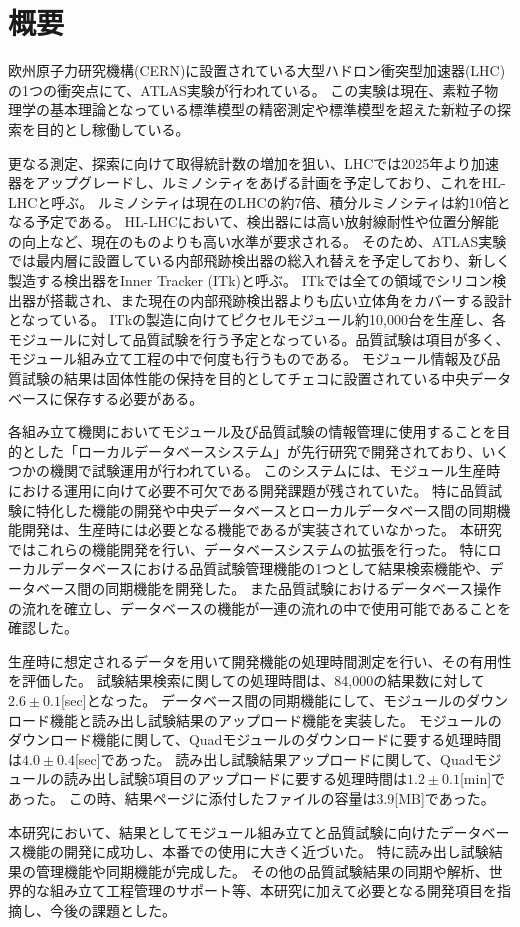 \chapter*{概要}

欧州原子力研究機構(CERN)に設置されている大型ハドロン衝突型加速器(LHC)の1つの衝突点にて、ATLAS実験が行われている。
この実験は現在、素粒子物理学の基本理論となっている標準模型の精密測定や標準模型を超えた新粒子の探索を目的とし稼働している。

更なる測定、探索に向けて取得統計数の増加を狙い、LHCでは2025年より加速器をアップグレードし、ルミノシティをあげる計画を予定しており、これをHL-LHCと呼ぶ。
ルミノシティは現在のLHCの約7倍、積分ルミノシティは約10倍となる予定である。
HL-LHCにおいて、検出器には高い放射線耐性や位置分解能の向上など、現在のものよりも高い水準が要求される。
そのため、ATLAS実験では最内層に設置している内部飛跡検出器の総入れ替えを予定しており、新しく製造する検出器をInner Tracker (ITk)と呼ぶ。
ITkでは全ての領域でシリコン検出器が搭載され、また現在の内部飛跡検出器よりも広い立体角をカバーする設計となっている。
ITkの製造に向けてピクセルモジュール約10,000台を生産し、各モジュールに対して品質試験を行う予定となっている。品質試験は項目が多く、モジュール組み立て工程の中で何度も行うものである。
モジュール情報及び品質試験の結果は固体性能の保持を目的としてチェコに設置されている中央データベースに保存する必要がある。

各組み立て機関においてモジュール及び品質試験の情報管理に使用することを目的とした「ローカルデータベースシステム」が先行研究で開発されており、いくつかの機関で試験運用が行われている。
このシステムには、モジュール生産時における運用に向けて必要不可欠である開発課題が残されていた。
特に品質試験に特化した機能の開発や中央データベースとローカルデータベース間の同期機能開発は、生産時には必要となる機能であるが実装されていなかった。
本研究ではこれらの機能開発を行い、データベースシステムの拡張を行った。
特にローカルデータベースにおける品質試験管理機能の1つとして結果検索機能や、データベース間の同期機能を開発した。
また品質試験におけるデータベース操作の流れを確立し、データベースの機能が一連の流れの中で使用可能であることを確認した。

生産時に想定されるデータを用いて開発機能の処理時間測定を行い、その有用性を評価した。
試験結果検索に関しての処理時間は、84,000の結果数に対して$2.6\pm 0.1$[sec]となった。
データベース間の同期機能にして、モジュールのダウンロード機能と読み出し試験結果のアップロード機能を実装した。
モジュールのダウンロード機能に関して、Quadモジュールのダウンロードに要する処理時間は$4.0\pm 0.4$[sec]であった。
読み出し試験結果アップロードに関して、Quadモジュールの読み出し試験5項目のアップロードに要する処理時間は$1.2\pm 0.1$[min]であった。
この時、結果ページに添付したファイルの容量は$3.9$[MB]であった。

本研究において、結果としてモジュール組み立てと品質試験に向けたデータベース機能の開発に成功し、本番での使用に大きく近づいた。
特に読み出し試験結果の管理機能や同期機能が完成した。
その他の品質試験結果の同期や解析、世界的な組み立て工程管理のサポート等、本研究に加えて必要となる開発項目を指摘し、今後の課題とした。

